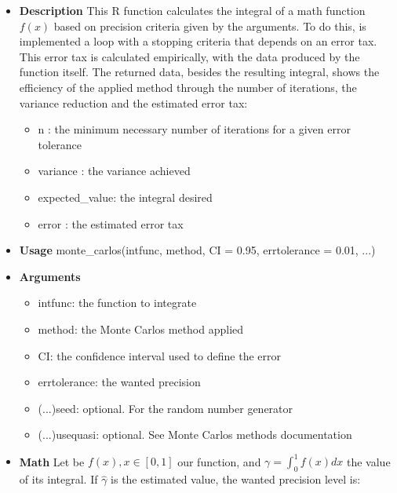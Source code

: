 \documentclass{article}
\begin{document}
\begin{itemize}
\item \textbf{Description}\newline
    This R function calculates the integral of a math function $f(x)$ based on precision criteria given by the arguments. To do this, is implemented a loop with a stopping criteria that depends on an error tax. This error tax is calculated empirically, with the data produced by the function itself. The returned data, besides the resulting integral, shows the efficiency of the applied method through the number of iterations, the variance reduction and the estimated error tax:
    \begin{itemize}
        \item n              : the minimum necessary number of iterations for a given error tolerance
        \item variance       : the variance achieved
        \item expected\_value: the integral desired      
        \item error          : the estimated error tax
    \end{itemize}
    
    \item \textbf{Usage}\newline
monte\_carlos(intfunc, method, CI = 0.95, errtolerance = 0.01, ...)    
    \item \textbf{Arguments}
    
    \begin{itemize}
        \item intfunc: the function to integrate
        \item method: the Monte Carlos method applied
        \item CI: the confidence interval used to define the error
        \item errtolerance: the wanted precision
        \item (...)seed: optional. For the random number generator
        \item (...)usequasi: optional. See Monte Carlos methods documentation
    \end{itemize}
    
    \item \textbf{Math}\newline
Let be $f(x), x \in [0,1]$ our function, and $\gamma = \int_{0}^{1}f(x)dx$ the value of its integral. If $\hat{\gamma}$ is the estimated value, the wanted precision level is:


\end{itemize}
\end{document}
